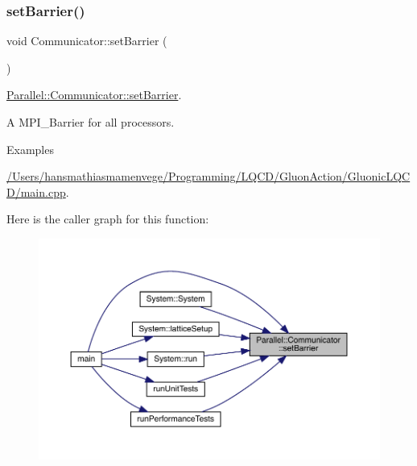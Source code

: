 \subsubsection{\texorpdfstring{setBarrier()}{setBarrier()}}
{\footnotesize\ttfamily void Communicator\+::set\+Barrier (\begin{DoxyParamCaption}{ }\end{DoxyParamCaption})\hspace{0.3cm}{\ttfamily [static]}}



\mbox{\hyperlink{class_parallel_1_1_communicator_a14aa3d54f5efe28094df886948e3dee2}{Parallel\+::\+Communicator\+::set\+Barrier}}. 

A M\+P\+I\+\_\+\+Barrier for all processors. \begin{Desc}
\item[Examples]\par
\mbox{\hyperlink{_2_users_2hansmathiasmamenvege_2_programming_2_l_q_c_d_2_gluon_action_2_gluonic_l_q_c_d_2main_8cpp-example}{/\+Users/hansmathiasmamenvege/\+Programming/\+L\+Q\+C\+D/\+Gluon\+Action/\+Gluonic\+L\+Q\+C\+D/main.\+cpp}}.\end{Desc}
Here is the caller graph for this function\+:
\nopagebreak
\begin{figure}[H]
\begin{center}
\leavevmode
\includegraphics[width=350pt]{class_parallel_1_1_communicator_a14aa3d54f5efe28094df886948e3dee2_icgraph}
\end{center}
\end{figure}
\mbox{\label{class_parallel_1_1_communicator_af61a4b8a49509982ae96d2a99dfb9f49}} 
